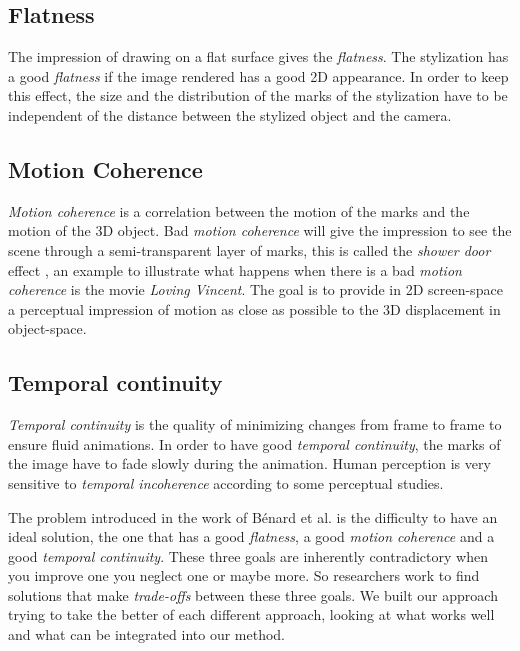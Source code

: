 \subsection{Flatness}

The impression of drawing on a flat surface gives the \textit{flatness}. The stylization has a good \textit{flatness} if the image rendered has a good 2D appearance. In order to keep this effect, the size and the distribution of the marks of the stylization have to be independent of the distance between the stylized object and the camera.

\subsection{Motion Coherence}

\textit{Motion coherence} is a correlation between the motion of the marks and the motion of the 3D object. Bad \textit{motion coherence} will give the impression to see the scene through a semi-transparent layer of marks, this is called the \textit{shower door} effect \cite{meier_painterly_1996}, an example to illustrate what happens when there is a bad \textit{motion coherence} is the movie \textit{Loving Vincent}\cite{LovingVincent}. The goal is to provide in 2D screen-space a perceptual impression of motion as
close as possible to the 3D displacement in object-space.

\subsection{Temporal continuity}

\textit{Temporal continuity} is the quality of minimizing changes from frame to frame to ensure fluid animations. In order to have good \textit{temporal continuity}, the marks of the image have to fade slowly during the animation. Human perception is very sensitive to \textit{temporal incoherence} according to some perceptual studies\cite{percept_studies, Schwarz_2009}. \newline


The problem introduced in the work of Bénard et al.\cite{benard_state---art_2011} is the difficulty to have an ideal solution, the one that has a good \textit{flatness}, a good \textit{motion coherence} and a good \textit{temporal continuity}. These three goals are inherently contradictory when you improve one you neglect one or maybe more. So researchers work to find solutions that make \textit{trade-offs} between these three goals. We built our approach trying to take the better of each different approach, looking at what works well and what can be integrated into our method.

